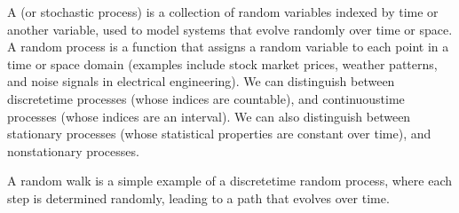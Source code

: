 \documentclass[letterpaper,10pt,english]{jupyterBook}
\begin{document}
\sphinxAtStartPar
A  (or stochastic process) is a collection of random variables indexed by time or another variable, used to model systems that evolve randomly over time or space. A random process is a function that assigns a random variable to each point in a time or space domain (examples include stock market prices, weather patterns, and noise signals in electrical engineering). We can distinguish between discrete\sphinxhyphen{}time processes (whose indices are countable), and continuous\sphinxhyphen{}time processes (whose indices are an interval). We can also distinguish between stationary processes (whose statistical properties are constant over time), and nonstationary processes.

\sphinxAtStartPar
A random walk is a simple example of a discrete\sphinxhyphen{}time random process, where each step is determined randomly, leading to a path that evolves over time.
\end{document}
